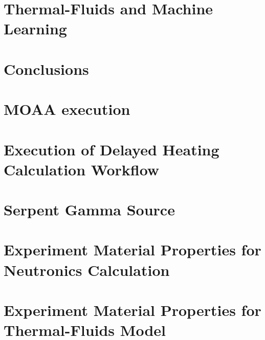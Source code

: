 \documentclass{uiucthesis2021}
\newcounter{counterforappendices}
\begin{document}
\chapter{Thermal-Fluids and Machine Learning}


\chapter{Conclusions}


\backmatter
\printbibliography[heading=bibintoc, title={References}]

\clearpage
\setcounter{counterforappendices}{\value{page}}
\mainmatter
\setcounter{page}{\value{counterforappendices}}
\appendix

\chapter{MOAA execution}


\chapter{Execution of Delayed Heating Calculation Workflow}


\chapter{Serpent Gamma Source}


% 

\chapter{Experiment Material Properties for Neutronics Calculation}


\chapter{Experiment Material Properties for Thermal-Fluids Model}

\end{document}
